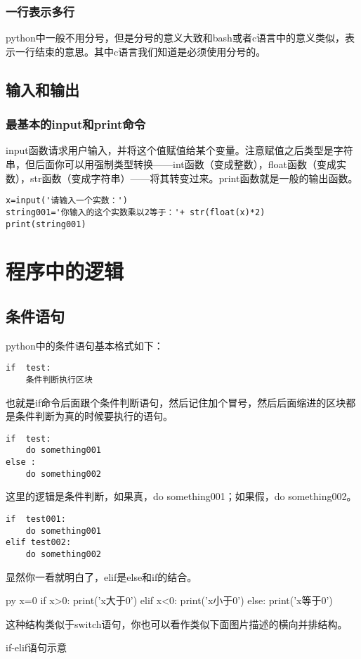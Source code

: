 \documentclass[12pt,oneside]{book}
\begin{document}
\begin{common-format}
\subsection{一行表示多行}
python中一般不用分号，但是分号的意义大致和bash或者c语言中的意义类似，表示一行结束的意思。其中c语言我们知道是必须使用分号的。


\section{输入和输出}
\subsection{最基本的input和print命令}
input函数请求用户输入，并将这个值赋值给某个变量。注意赋值之后类型是字符串，但后面你可以用强制类型转换——int函数（变成整数），float函数（变成实数），str函数（变成字符串）——将其转变过来。print函数就是一般的输出函数。

\begin{Verbatim}
x=input('请输入一个实数：')
string001='你输入的这个实数乘以2等于：'+ str(float(x)*2)
print(string001)
\end{Verbatim}





\chapter{程序中的逻辑}
\section{条件语句}
python中的条件语句基本格式如下：
\begin{Verbatim}
if  test:
    条件判断执行区块
\end{Verbatim}
也就是if命令后面跟个条件判断语句，然后记住加个冒号，然后后面缩进的区块都是条件判断为真的时候要执行的语句。

\begin{Verbatim}
if  test:
    do something001
else :
    do something002
\end{Verbatim}
这里的逻辑是条件判断，如果真，do something001；如果假，do something002。

\begin{Verbatim}
if  test001:
    do something001
elif test002:
    do something002
\end{Verbatim}
显然你一看就明白了，elif是else和if的结合。

\begin{xverbatim}[129]{py}
x=0
if x>0:
    print('x大于0')
elif x<0:
    print('x小于0')
else:
    print('x等于0')
\end{xverbatim}
这种结构类似于switch语句，你也可以看作类似下面图片描述的横向并排结构。
\begin{linefig}{if-elif语句示意}
\label{fig:if-elif语句示意}
\end{linefig}



\end{common-format}
\end{document}
